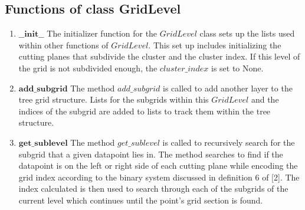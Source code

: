 \subsection{Functions of class GridLevel}
\begin{enumerate}    
    \item $\mathbf{\_\_init\_\_}$\newline
    {The initializer function for the $GridLevel$ class sets up the lists used within other functions of $GridLevel$.
    This set up includes initializing the cutting planes that subdivide the cluster and the cluster index. If this level of the grid is not subdivided enough, the $cluster\_index$ is set to None.}
    \item $\mathbf{add\_subgrid}$\newline
    {The method $add\_subgrid$ is called to add another layer to the tree grid structure.
    Lists for the subgrids within this $GridLevel$ and the indices of the subgrid are added to lists to track them within the tree structure.}
    \item $\mathbf{get\_sublevel}$\newline
    {The method $get\_sublevel$ is called to recursively search for the subgrid that a given datapoint lies in.
    The method searches to find if the datapoint is on the left or right side of each cutting plane while encoding the grid index according to the binary system discussed in definition 6 of [2].
    The index calculated is then used to search through each of the subgrids of the current level which continues until the point's grid section is found.}
\end{enumerate}


